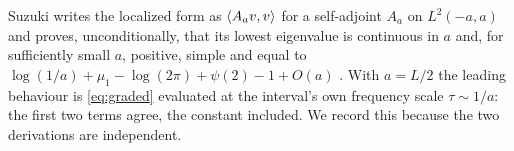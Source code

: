\begin{remark}\label{rem:suzuki-here}
Suzuki writes the localized form as $\langle A_av,v\rangle$ for a self-adjoint $A_a$ on
$L^2(-a,a)$ and proves, unconditionally, that its lowest eigenvalue is
continuous in $a$ and, for sufficiently small $a$, positive, simple and equal to
$\log(1/a)+\mu_1-\log(2\pi)+\psi(2)-1+O(a)$ \cite{Suzuki}. With $a=L/2$ the
leading behaviour is \eqref{eq:graded} evaluated at the interval's own frequency
scale $\tau\sim1/a$: the first two terms agree, the constant included. We record
this because the two derivations are independent.
\end{remark}
